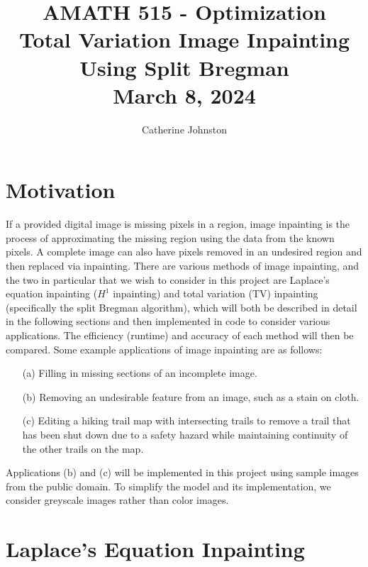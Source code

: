 \documentclass[11pt,reqno,twoside]{amsart}
\theoremstyle{plain}
\theoremstyle{definition}
\numberwithin{figure}{section}
\numberwithin{equation}{section}
\begin{document}
\title{AMATH 515 - Optimization \\ Total Variation Image Inpainting Using Split Bregman \\ March 8, 2024}
\author{Catherine Johnston}

\maketitle


\section{Motivation}

If a provided digital image is missing pixels in a region, image inpainting is the process of approximating the missing region using the data from the known pixels.  A complete image can also have pixels removed in an undesired region and then replaced via inpainting. There are various methods of image inpainting, and the two in particular that we wish to consider in this project are Laplace's equation inpainting ($H^1$ inpainting) and total variation (TV) inpainting (specifically the split Bregman algorithm), which will both be described in detail in the following sections and then implemented in code to consider various applications.  The efficiency (runtime) and accuracy of each method will then be compared.  Some example applications of image inpainting are as follows:
\begin{itemize}
\item[(a)] Filling in missing sections of an incomplete image.
\item[(b)] Removing an undesirable feature from an image, such as a stain on cloth. 
\item[(c)] Editing a hiking trail map with intersecting trails to remove a trail that has been shut down due to a safety hazard while maintaining continuity of the other trails on the map.
\end{itemize}
Applications (b) and (c) will be implemented in this project using sample images from the public domain.  To simplify the model and its implementation, we consider greyscale images rather than color images.

\newpage 

\section{Laplace's Equation Inpainting}
\end{document}
